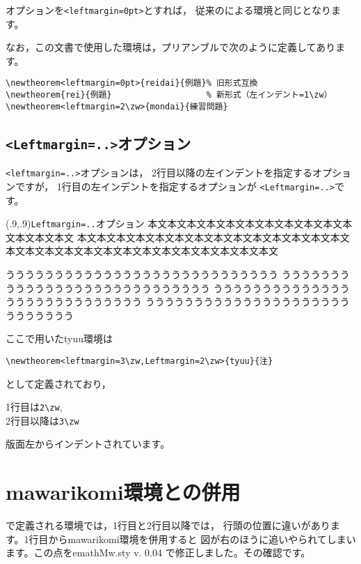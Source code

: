 \documentclass[a4j]{jarticle}
\newtheorem<leftmargin=0pt>{reidai}{例題}
\newtheorem<leftmargin=2\zw>{mondai}{練習問題}
\newtheorem<leftmargin=3\zw,Leftmargin=2\zw>{tyuu}{注}
\begin{document}
オプションを\verb+<leftmargin=0pt>+とすれば，
従来のによる環境と同じとなります。

なお，この文書で使用した環境は，プリアンブルで次のように定義してあります。

\begin{jquote}
\begin{verbatim}
\newtheorem<leftmargin=0pt>{reidai}{例題}% 旧形式互換
\newtheorem{rei}{例題}                   % 新形式（左インデント=1\zw）
\newtheorem<leftmargin=2\zw>{mondai}{練習問題}
\end{verbatim}
\end{jquote}
\clearpage

\subsection{\texttt{<Leftmargin=..>}オプション}
\verb+<leftmargin=..>+オプションは，
2行目以降の左インデントを指定するオプションですが，
1行目の左インデントを指定するオプションが
\verb+<Leftmargin=..>+です。

\begin{showEx}(.9,.9){\texttt{Leftmargin=..}オプション}
本文本文本文本文本文本文本文本文本文本文本文本文本文本文
本文本文本文本文本文本文本文本文本文本文本文本文本文本文
本文本文本文本文本文本文本文本文本文本文本文本文本文本文

\begin{tyuu}
うううううううううううううううううううううううううううう
うううううううううううううううううううううううううううう
うううううううううううううううううううううううううううう
うううううううううううううううううううううううううううう
\end{tyuu}
\end{showEx}

ここで用いた\textsf{tyuu}環境は
\begin{jquote}
\begin{verbatim}
\newtheorem<leftmargin=3\zw,Leftmargin=2\zw>{tyuu}{注}
\end{verbatim}
\end{jquote}
として定義されており，
\begin{jquote}
  1行目は\verb+2\zw+,\\
  2行目以降は\verb+3\zw+
\end{jquote}
版面左からインデントされています。
\clearpage

\section{\textsf{mawarikomi}環境との併用}
で定義される環境では，1行目と2行目以降では，
行頭の位置に違いがあります。1行目から\textsf{mawarikomi}環境を併用すると
図が右のほうに追いやられてしまいます。この点を\textsf{emathMw.sty v. 0.04}
で修正しました。その確認です。
\end{document}
